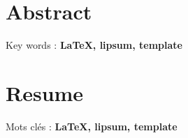 \chapter*{Abstract}

\noindent \lipsum[14] \newline

\noindent Key words : \textbf{LaTeX, lipsum, template}

 
\chapter*{Resume}

\noindent \lipsum[15] \newline

\noindent Mots clés : \textbf{LaTeX, lipsum, template}
